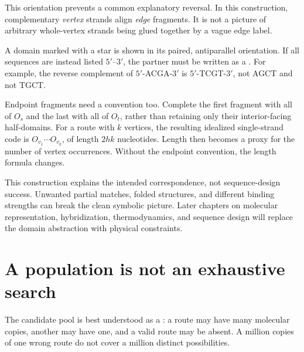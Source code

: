 This orientation prevents a common explanatory reversal. In this construction, complementary \emph{vertex} strands align \emph{edge} fragments. It is not a picture of arbitrary whole-vertex strands being glued together by a vague edge label.

A domain marked with a star is shown in its paired, antiparallel orientation. If all sequences are instead listed $5'$--$3'$, the partner must be written as a . For example, the reverse complement of $5'$-ACGA-$3'$ is $5'$-TCGT-$3'$, not AGCT and not TGCT.

Endpoint fragments need a convention too. Complete the first fragment with all of $O_s$ and the last with all of $O_t$, rather than retaining only their interior-facing half-domains. For a route with $k$ vertices, the resulting idealized single-strand code is $O_{v_1}\cdots O_{v_k}$, of length $2hk$ nucleotides. Length then becomes a proxy for the number of vertex occurrences. Without the endpoint convention, the length formula changes.

This construction explains the intended correspondence, not sequence-design success. Unwanted partial matches, folded structures, and different binding strengths can break the clean symbolic picture. Later chapters on molecular representation, hybridization, thermodynamics, and sequence design will replace the domain abstraction with physical constraints.

\section{A population is not an exhaustive search}\label{sec:population}
The candidate pool is best understood as a : a route may have many molecular copies, another may have one, and a valid route may be absent. A million copies of one wrong route do not cover a million distinct possibilities.

